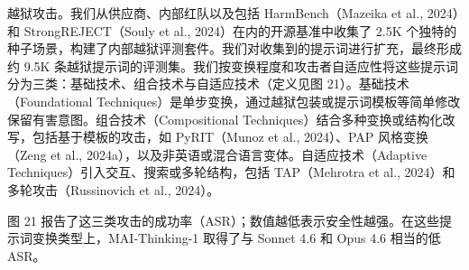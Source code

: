 越狱攻击。我们从供应商、内部红队以及包括 HarmBench（Mazeika et al., 2024）和 StrongREJECT（Souly et al., 2024）在内的开源基准中收集了 2.5K 个独特的种子场景，构建了内部越狱评测套件。我们对收集到的提示词进行扩充，最终形成约 9.5K 条越狱提示词的评测集。我们按变换程度和攻击者自适应性将这些提示词分为三类：基础技术、组合技术与自适应技术（定义见图 21）。基础技术（Foundational Techniques）是单步变换，通过越狱包装或提示词模板等简单修改保留有害意图。组合技术（Compositional Techniques）结合多种变换或结构化改写，包括基于模板的攻击，如 PyRIT（Munoz et al., 2024）、PAP 风格变换（Zeng et al., 2024a），以及非英语或混合语言变体。自适应技术（Adaptive Techniques）引入交互、搜索或多轮结构，包括 TAP（Mehrotra et al., 2024）和多轮攻击（Russinovich et al., 2024）。

图 21 报告了这三类攻击的成功率（ASR）；数值越低表示安全性越强。在这些提示词变换类型上，MAI-Thinking-1 取得了与 Sonnet 4.6 和 Opus 4.6 相当的低 ASR。

